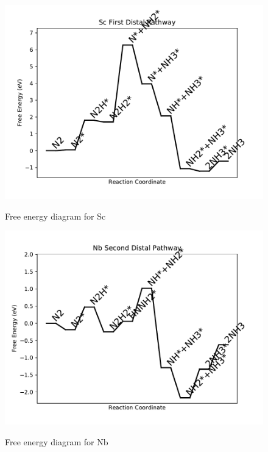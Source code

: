 \documentclass{article}
\begin{document}
\begin{figure}
\includegraphics[width=1\linewidth]{data/plots/Sc_distal_1.pdf}
\label{fig:Sc_distal_1}
\caption{Free energy diagram for Sc}
\end{figure}

\clearpage
\begin{figure}
\includegraphics[width=1\linewidth]{data/plots/Nb_distal_2.pdf}
\label{fig:Nb_distal_2}
\caption{Free energy diagram for Nb}
\end{figure}
\end{document}
